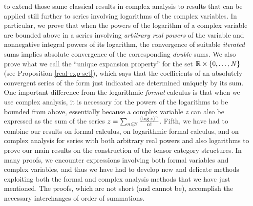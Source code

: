 \documentclass[12pt]{article}
\begin{document}
\begin{rema}
{to extend those same classical results in complex analysis to results
that can be applied still further to series involving logarithms of
the complex variables.  In particular, we prove that when the powers
of the logarithm of a complex variable are bounded above in a series
involving {\it arbitrary real powers} of the variable and nonnegative
integral powers of its logarithm, the convergence of suitable {\it
iterated} sums implies absolute convergence of the corresponding {\it
double} sums.  We also prove what we call the ``unique expansion
property'' for the set $\mathbb{R}\times \{0, \dots, N\}$ (see Proposition
\ref{real-exp-set}), which says that the coefficients of an absolutely
convergent series of the form just indicated are determined uniquely
by its sum.  One important difference from the logarithmic {\it
formal} calculus is that when we use complex analysis, it is necessary
for the powers of the logarithms to be bounded from above, essentially
because a complex variable $z$ can also be expressed as the sum of the
series $z=\sum_{n\in \mathbb{N}}\frac{(\log z)^{n}}{n!}$.  Fifth, we have had
to combine our results on formal calculus, on logarithmic formal
calculus, and on complex analysis for series with both arbitrary real
powers and also logarithms to prove our main results on the
construction of the tensor category structures.  In many proofs, we
encounter expressions involving both formal variables and complex
variables, and thus we have had to develop new and delicate methods
exploiting both the formal and complex analysis methods that we have
just mentioned.  The proofs, which are not short (and cannot be),
accomplish the necessary interchanges of order of summations.}
\end{rema}
\end{document}

